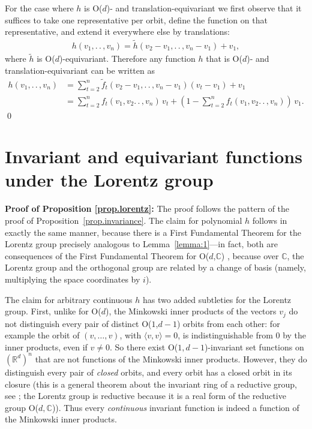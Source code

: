 \documentclass{article}
\renewcommand{\paragraph}[1]{\par\textbf{#1}}
\theoremstyle{Hogg}
\newcommand{\inner}[2]{\langle{#1},{#2}\rangle}
\renewcommand{\ldots}{.\,.\,}
\begin{document}
For the case where $h$ is O($d$)- and translation-equivariant we first observe that it suffices to take one representative per orbit, define the function on that representative, and extend it everywhere else by translations: 
\begin{align}
    h(v_1,\ldots, v_n)= \tilde h(v_2-v_1,\ldots, v_n-v_1)+v_1,
\end{align}
where $\tilde h$ is O($d$)-equivariant.
Therefore any function $h$ that is O($d$)- and translation-equivariant can be written as
\begin{align}
    h(v_1,\ldots, v_n)&= \textstyle\sum_{t=2}^n \tilde f_t(v_2-v_1,\ldots, v_n-v_1)(v_t-v_1) + v_1 \\
    &=  \textstyle\sum_{t=2}^n f_t(v_1, v_2\ldots, v_n)\,v_t  + \left(1- \textstyle\sum_{t=2}^n f_t(v_1, v_2\ldots, v_n)\right)\,v_1. 
\end{align}
\qed


\section{Invariant and equivariant functions under the Lorentz group}
\label{app.lorentz}
\paragraph{Proof of Proposition \ref{prop.lorentz}:}
The proof follows the pattern of the proof of Proposition~\ref{prop.invariance}. The claim for polynomial $h$ follows in exactly the same manner, because there is a First Fundamental Theorem for the Lorentz group precisely analogous to Lemma~\ref{lemma:1}---in fact, both are consequences of the First Fundamental Theorem for O($d$,$\mathbb C$) \cite[Proposition~5.2.2]{goodman2009symmetry}, because over $\mathbb C$, the Lorentz group and the orthogonal group are related by a change of basis (namely, multiplying the space coordinates by $i$). 

The claim for arbitrary continuous $h$ has two added subtleties for the Lorentz group. First, unlike for O($d$), the Minkowski inner products of the vectors $v_j$ do not distinguish every pair of distinct O($1$,$d-1$) orbits from each other: for example the orbit of $(v,\dots,v)$, with $\inner{v}{v}=0$, is indistinguishable from $0$ by the inner products, even if $v\neq 0$. So there exist O($1,d-1$)-invariant set functions on $(\mathbb R^d)^n$ that are not functions of the Minkowski inner products. However, they do distinguish every pair of {\em closed} orbits, and every orbit has a closed orbit in its closure (this is a general theorem about the invariant ring of a reductive group, see \cite[Theorems~4.6 and 4.7 and their corollaries]{popov1994invariant}; the Lorentz group is reductive because it is a real form of the reductive group O($d, \mathbb C$)). Thus every {\em continuous} invariant function is indeed a function of the Minkowski inner products.
\end{document}
